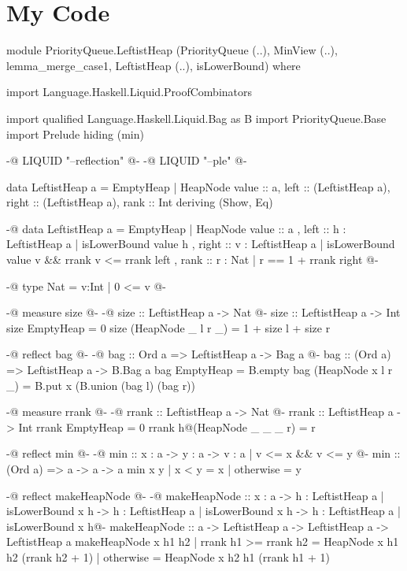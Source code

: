 \appendix

\chapter{My Code}

\begin{code}[caption={Leftist Heap}, label={lst:leftist-heap}]

module PriorityQueue.LeftistHeap (PriorityQueue (..), MinView (..), lemma_merge_case1, LeftistHeap (..), isLowerBound) where

import Language.Haskell.Liquid.ProofCombinators

import qualified Language.Haskell.Liquid.Bag as B
import PriorityQueue.Base
import Prelude hiding (min)

{-@ LIQUID "--reflection" @-}
{-@ LIQUID "--ple" @-}

data LeftistHeap a = EmptyHeap | HeapNode {value :: a, left :: (LeftistHeap a), right :: (LeftistHeap a), rank :: Int}
  deriving (Show, Eq)

{-@ data LeftistHeap a = EmptyHeap
      | HeapNode { value :: a
         , left  :: {h : LeftistHeap a | isLowerBound value h}
         , right :: {v : LeftistHeap a  | isLowerBound value v
                    && rrank v <= rrank left }
         , rank :: {r : Nat | r == 1 + rrank right}
        }
@-}

{-@ type Nat = {v:Int | 0 <= v} @-}

{-@ measure size @-}
{-@ size :: LeftistHeap a -> Nat @-}
size :: LeftistHeap a -> Int
size EmptyHeap = 0
size (HeapNode _ l r _) = 1 + size l + size r

{-@ reflect bag @-}
{-@ bag :: Ord a => LeftistHeap a -> Bag a @-}
bag :: (Ord a) => LeftistHeap a -> B.Bag a
bag EmptyHeap = B.empty
bag (HeapNode x l r _) = B.put x (B.union (bag l) (bag r))

{-@ measure rrank @-}
{-@ rrank :: LeftistHeap a -> Nat @-}
rrank :: LeftistHeap a -> Int
rrank EmptyHeap = 0
rrank h@(HeapNode _ _ _ r) = r

{-@ reflect min @-}
{-@ min :: x : a -> y : a -> {v : a |  v <= x && v <= y} @-}
min :: (Ord a) => a -> a -> a
min x y
  | x < y = x
  | otherwise = y

{-@ reflect makeHeapNode @-}
{-@ makeHeapNode :: x : a -> {h : LeftistHeap a | isLowerBound x h} -> {h : LeftistHeap a | isLowerBound x h} -> {h : LeftistHeap a | isLowerBound x h}@-}
makeHeapNode :: a -> LeftistHeap a -> LeftistHeap a -> LeftistHeap a
makeHeapNode x h1 h2
  | rrank h1 >= rrank h2 = HeapNode x h1 h2 (rrank h2 + 1)
  | otherwise = HeapNode x h2 h1 (rrank h1 + 1)


\end{code}
